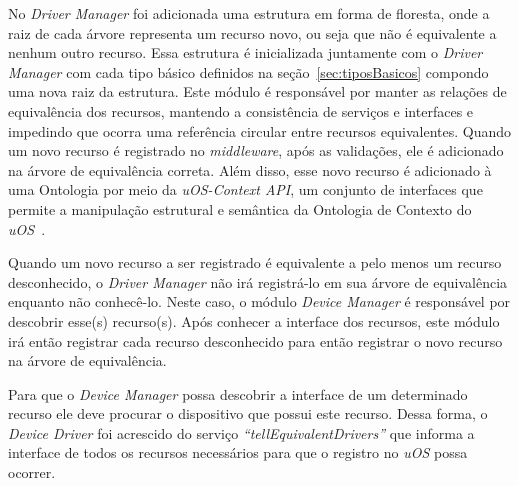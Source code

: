 No \emph{Driver Manager} foi adicionada uma estrutura em forma de floresta, onde a raiz de cada árvore representa um recurso novo, ou seja que não é equivalente a nenhum outro recurso. Essa estrutura é inicializada juntamente com o \emph{Driver Manager} com cada tipo básico definidos na seção~\ref{sec:tiposBasicos} compondo uma nova raiz da estrutura. Este módulo é responsável por manter as relações de equivalência dos recursos, mantendo a consistência de serviços e interfaces e impedindo que ocorra uma referência circular entre recursos equivalentes. Quando um novo recurso é registrado no \emph{middleware}, após as validações, ele é adicionado na árvore de equivalência correta. Além disso, esse novo recurso é adicionado à uma Ontologia por meio da \emph{uOS-Context API}, um conjunto de interfaces que permite a manipulação estrutural e semântica da Ontologia de Contexto do \emph{uOS}~\cite{ozakisbcup2011}.

Quando um novo recurso a ser registrado é equivalente a pelo menos um recurso desconhecido, o \emph{Driver Manager} não irá registrá-lo em sua árvore de equivalência enquanto não conhecê-lo. Neste caso, o módulo \emph{Device Manager} é responsável por descobrir esse(s) recurso(s). Após conhecer a interface dos recursos, este módulo irá então registrar cada recurso desconhecido para então registrar o novo recurso na árvore de equivalência.

Para que o \emph{Device Manager} possa descobrir a interface de um determinado recurso ele deve procurar o dispositivo que possui este recurso. Dessa forma, o \emph{Device Driver} foi acrescido do serviço \emph{``tellEquivalentDrivers''} que informa a interface de todos os recursos necessários para que o registro no \emph{uOS} possa ocorrer.